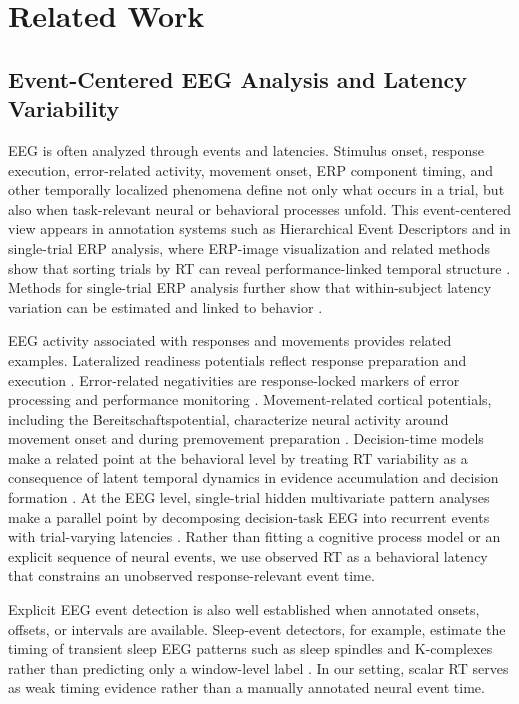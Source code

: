 \documentclass[12pt]{article}
\begin{document}
\section{Related Work}

\subsection{Event-Centered EEG Analysis and Latency Variability}
EEG is often analyzed through events and latencies. Stimulus onset, response execution, error-related activity, movement onset, ERP component timing, and other temporally localized phenomena define not only what occurs in a trial, but also when task-relevant neural or behavioral processes unfold. This event-centered view appears in annotation systems such as Hierarchical Event Descriptors \citep{BigdelyShamlo2016HED} and in single-trial ERP analysis, where ERP-image visualization and related methods show that sorting trials by RT can reveal performance-linked temporal structure \citep{Jung1998SingleTrialERP}. Methods for single-trial ERP analysis further show that within-subject latency variation can be estimated and linked to behavior \citep{Ouyang2011RIDE,Ouyang2017LatencyReview}.

EEG activity associated with responses and movements provides related examples. Lateralized readiness potentials reflect response preparation and execution \citep{Coles1989LRP}. Error-related negativities are response-locked markers of error processing and performance monitoring \citep{Gehring1993ErrorDetection,HolroydColes2002ERN}. Movement-related cortical potentials, including the Bereitschaftspotential, characterize neural activity around movement onset and during premovement preparation \citep{KornhuberDeecke1965BP,ShibasakiHallett2006BP}. Decision-time models make a related point at the behavioral level by treating RT variability as a consequence of latent temporal dynamics in evidence accumulation and decision formation \citep{Ratcliff2008Diffusion,OConnell2012Supramodal,Kelly2013Internal}. At the EEG level, single-trial hidden multivariate pattern analyses make a parallel point by decomposing decision-task EEG into recurrent events with trial-varying latencies \citep{Weindel2025DecisionComponents}. Rather than fitting a cognitive process model or an explicit sequence of neural events, we use observed RT as a behavioral latency that constrains an unobserved response-relevant event time.

Explicit EEG event detection is also well established when annotated onsets, offsets, or intervals are available. Sleep-event detectors, for example, estimate the timing of transient sleep EEG patterns such as sleep spindles and K-complexes rather than predicting only a window-level label \citep{Chambon2019DOSED,TapiaRivas2024SEED}. In our setting, scalar RT serves as weak timing evidence rather than a manually annotated neural event time.
\end{document}
